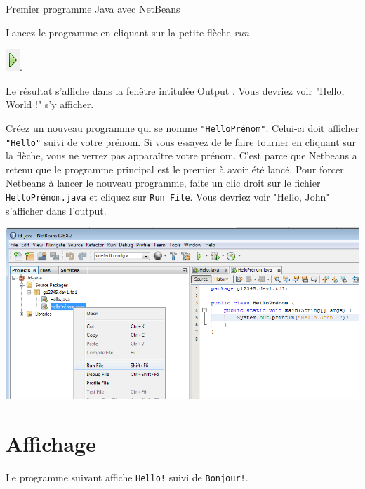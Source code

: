\documentclass[a4paper,11pt]{style-esi/td}
\begin{document}
\begin{Tutoriel}{Premier programme Java avec NetBeans}
\begin{steps}
		\item Lancez le programme en cliquant sur la petite flèche \emph{run}

		\includegraphics{images/nb_newproject_run}.

		Le résultat s'affiche dans la fenêtre intitulée \og Output \fg.
		Vous devriez voir "Hello, World !" s'y afficher.

		\item Créez un nouveau programme qui se nomme \texttt{"HelloPrénom"}. Celui-ci doit afficher \texttt{"Hello"} suivi de votre prénom.
		Si vous essayez de le faire tourner en cliquant sur la flèche, vous ne verrez pas apparaître votre prénom. C'est parce que Netbeans a retenu que le programme principal est le premier à avoir été lancé. Pour forcer Netbeans à lancer le nouveau programme, faite un clic droit sur le fichier \texttt{HelloPrénom.java} et cliquez sur \texttt{Run File}. Vous devriez voir "Hello, John" s'afficher dans l'output.

		\begin{center}
			\includegraphics[width=.9\textwidth]{images/nb_newproject_run_othermain}
		\end{center}

	\end{steps}

\end{Tutoriel}

\section{Affichage}

Le programme suivant affiche \texttt{Hello!} suivi de \texttt{Bonjour!}.
\end{document}
